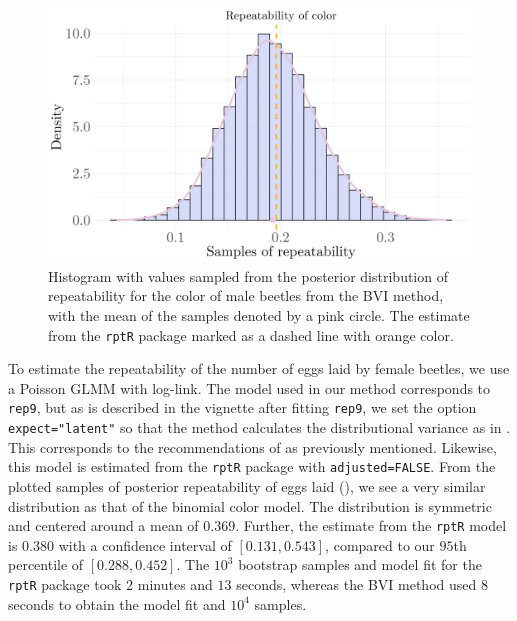\begin{figure}[H]
  \centering
  \includegraphics[width=1\linewidth]{Figures/Stoffel Comparison/Heritability_colour_Binomial.png}
  \caption[Estimated repeatability of color in male beetles]{Histogram with values sampled from the posterior distribution of repeatability for the color of male beetles from the BVI method, with the mean of the samples denoted by a pink circle. The estimate from the \texttt{rptR} package marked as a dashed line with orange color.}
  \label{fig:heritability_colour_Binomial}
\end{figure}
\noindent To estimate the repeatability of the number of eggs laid by female beetles, we use a Poisson GLMM with log-link. The model used in our method corresponds to \texttt{rep9}, but as is described in the vignette after fitting \texttt{rep9}, we set the option \texttt{expect="latent"} so that the method calculates the distributional variance as in . This corresponds to the recommendations of \citet{nakagawa2017} as previously mentioned. Likewise, this model is estimated from the \texttt{rptR} package with \texttt{adjusted=FALSE}. From the plotted samples of posterior repeatability of eggs laid (), we see a very similar distribution as that of the binomial color model. The distribution is symmetric and centered around a mean of $0.369$. Further, the estimate from the \texttt{rptR} model is $0.380$ with a confidence interval of $[0.131, 0.543]$, compared to our $95$th percentile of $[0.288, 0.452]$. The $10^3$ bootstrap samples and model fit for the \texttt{rptR} package took $2$ minutes and $13$ seconds, whereas the BVI method used $8$ seconds to obtain the model fit and $10^4$ samples.
